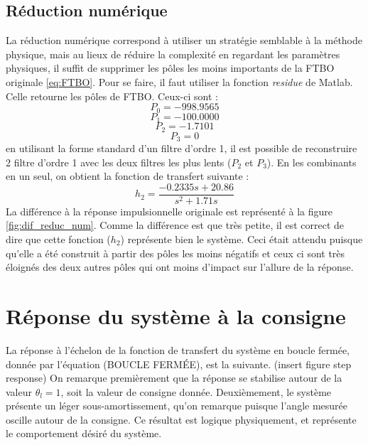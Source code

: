 \documentclass{udes_rapport} %
\begin{document}
\subsection{Réduction numérique}
La réduction numérique correspond à utiliser un stratégie semblable à la méthode physique, mais au lieux de réduire la complexité en regardant les paramètres physiques, il suffit de supprimer les pôles les moins importants de la FTBO originale \eqref{eq:FTBO}. Pour se faire, il faut utiliser la fonction \textit{residue} de Matlab. Celle retourne les pôles de FTBO. Ceux-ci sont :
\[	P_0 = -998.9565	\]
\[	P_1 = -100.0000	\]
\[	P_2 = -1.7101	\]
\[	P_3 = 0	\]
en utilisant la forme standard d'un filtre d'ordre 1, il est possible de reconstruire 2 filtre d'ordre 1 avec les deux filtres les plus lents ($P_2$ et $P_3$). En les combinants en un seul, on obtient la fonction de transfert suivante :
\begin{equation}
h_2 = \frac{-0.2335s + 20.86}{s^2 + 1.71s}
\end{equation}
La différence à la réponse impulsionnelle originale est représenté à la figure \ref{fig:dif_reduc_num}. Comme la différence est que très petite, il est correct de dire que cette fonction ($h_2$) représente bien le système. Ceci était attendu puisque qu'elle a été construit à partir des pôles les moins négatifs et ceux ci sont très éloignés des deux autres pôles qui ont moins d'impact sur l'allure de la réponse.


\section{Réponse du système à la consigne}
La réponse à l'échelon de la fonction de transfert du système en boucle fermée, donnée par l'équation (BOUCLE FERMÉE), est la suivante.
(insert figure step response)
On remarque premièrement que la réponse se stabilise autour de la valeur $\theta_l = 1$, soit la valeur de consigne donnée.
Deuxièmement, le système présente un léger sous-amortissement, qu'on remarque puisque l'angle mesurée oscille autour de la consigne.
Ce résultat est logique physiquement, et représente le comportement désiré du système.
\end{document}

